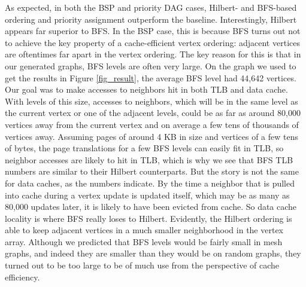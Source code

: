 \documentclass[journal]{IEEEtran}
\begin{document}
As expected, in both the BSP and priority DAG cases, Hilbert- and BFS-based ordering and priority assignment outperform the baseline. Interestingly, Hilbert appears far superior to BFS. In the BSP case, this is because BFS turns out not to achieve the key property of a cache-efficient vertex ordering: adjacent vertices are oftentimes far apart in the vertex ordering. The key reason for this is that in our generated graphs, BFS levels are often very large. On the graph we used to get the results in Figure \ref{fig_result}, the average BFS level had 44,642 vertices. Our goal was to make accesses to neighbors hit in both TLB and data cache. With levels of this size, accesses to neighbors, which will be in the same level as the current vertex or one of the adjacent levels, could be as far as around 80,000 vertices away from the current vertex and on average a few tens of thousands of vertices away. Assuming pages of around 4 KB in size and vertices of a few tens of bytes, the page translations for a few BFS levels can easily fit in TLB, so neighbor accesses are likely to hit in TLB, which is why we see that BFS TLB numbers are similar to their Hilbert counterparts. But the story is not the same for data caches, as the numbers indicate. By the time a neighbor that is pulled into cache during a vertex update is updated itself, which may be as many as 80,000 updates later, it is likely to have been evicted from cache. So data cache locality is where BFS really loses to Hilbert. Evidently, the Hilbert ordering is able to keep adjacent vertices in a much smaller neighborhood in the vertex array. Although we predicted that BFS levels would be fairly small in mesh graphs, and indeed they are smaller than they would be on random graphs, they turned out to be too large to be of much use from the perspective of cache efficiency.
\end{document}
